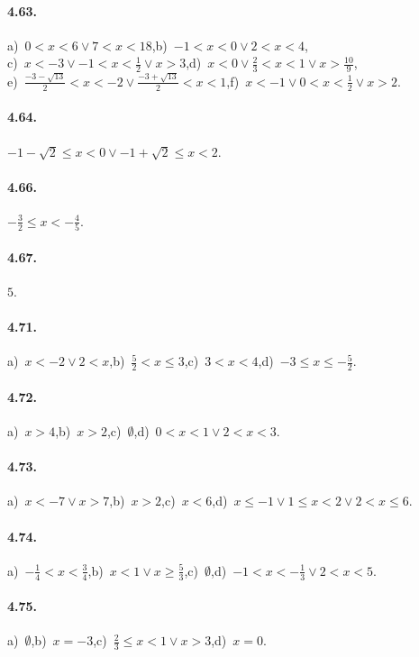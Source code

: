 \paragraph{4.63.} a)~$0<x<6\vee 7<x<18$,\quad b)~$-1<x<0\vee 2<x<4$,\protect\\
c)~$x<-3\vee -1<x<\frac{1}{2}\vee x>3$,\quad d)~$x<0\vee \frac{2}{3}<x<1\vee x>\frac{10}{9}$,\protect\\ e)~$\frac{-3-\sqrt{13}}{2}<x<-2\vee \frac{-3+\sqrt{13}}{2}<x<1$,\quad f)~$x<-1\vee 0<x<\frac{1}{2}\vee x>2$.

\paragraph{4.64.} $-1-\sqrt 2\le x<0\vee -1+\sqrt 2\le x<2$.

\paragraph{4.66.} $-\frac 3 2\le x<-\frac 4 5$.

\paragraph{4.67.} $ 5 $.

\paragraph{4.71.} a)~$x<-2\vee 2<x$,\quad b)~$\frac 5 2<x\le 3$,\quad c)~$3<x<4$,\quad d)~$-3\le x\le -\frac 5 2$.

\paragraph{4.72.} a)~$x>4$,\quad b)~$x>2$,\quad c)~$\emptyset$,\quad d)~$0<x<1 \vee 2<x<3$.

\paragraph{4.73.} a)~$x<-7\vee x>7$,\quad b)~$x>2$,\quad c)~$x<6$,\quad d)~$x\le -1\vee 1\le x<2\vee 2<x\le 6$.

\paragraph{4.74.} a)~$-\frac{1}{4}<x<\frac{3}{4}$,\quad b)~$x<1 \vee x\ge \frac{5}{3}$,\quad c)~$\emptyset$,\quad d)~$-1<x<-\frac{1}{3} \vee 2<x<5$.

\paragraph{4.75.} a)~$\emptyset $,\quad b)~$x=-3$,\quad c)~$\frac 2 3\le x<1\vee x>3$,\quad d)~$x=0$.

